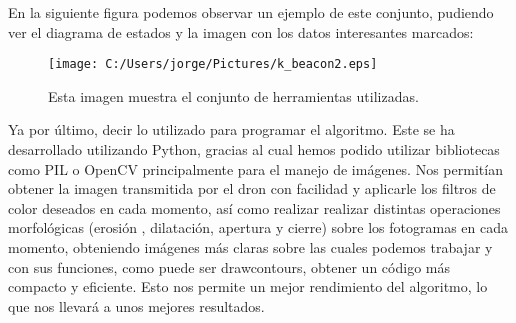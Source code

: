 \documentclass{report}
\begin{document}
En la siguiente figura podemos observar un ejemplo de este conjunto, pudiendo ver el diagrama de estados y la imagen con los datos interesantes marcados:

\begin{figure}[ht]
	\centering
		\texttt{[image: C:/Users/jorge/Pictures/k\_beacon2.eps]}
		\caption{Esta imagen muestra el conjunto de herramientas utilizadas.}
	\label{fig:Herramientas}
\end{figure}


\hspace{1 cm} Ya por \'ultimo, decir lo utilizado para programar el algoritmo. Este se ha desarrollado utilizando Python, gracias al cual hemos podido utilizar bibliotecas como PIL o OpenCV principalmente para el manejo de im\'agenes. Nos permit\'ian obtener la imagen transmitida por el dron con facilidad y aplicarle los filtros de color deseados en cada momento, as\'i como realizar realizar distintas operaciones morfol\'ogicas (erosi\'on , dilataci\'on, apertura y cierre) sobre los fotogramas en cada momento, obteniendo im\'agenes m\'as claras sobre las cuales podemos trabajar y con sus funciones, como puede ser drawcontours, obtener un c\'odigo m\'as compacto y eficiente. Esto nos permite un mejor rendimiento del algoritmo, lo que nos llevar\'a a unos mejores resultados. 
\end{document}
